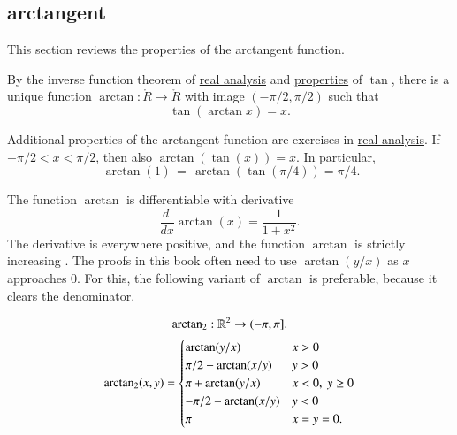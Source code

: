 \subsection{arctangent}

This section reviews the properties of the arctangent function.  

\begin{definition}[arctangent]\label{def:arctan}
  By the inverse function theorem of \hyperref[back:analysis]{real
    analysis} and \hyperref[lemma:tan-monotone]{properties} of $\tan$,
  there is a unique function $\arctan:\ring{R}\to\ring{R}$ with image
  $(-\pi/2,\pi/2)$ such that
\begin{equation}\label{eqn:tanarctan}\tan(\arctan x) =x.\end{equation}
%
\end{definition}

Additional properties of the arctangent function are exercises in
\hyperref[back:analysis]{real analysis}.  If $-\pi/2 < x < \pi/2$,
then also $\arctan(\tan(x)) = x$. In particular,%
\begin{equation}\label{eqn:arctan-1}\
\arctan(1) \hyperref[lemma:tan-pi4]{\,=\,} \arctan(\tan(\pi/4)) = \pi/4.
\end{equation}


The function $\arctan$ is differentiable with derivative%
\begin{equation}\label{eqn:deriv-tan}\frac{d\phantom{~}} {dx} \arctan(x) = \frac{1}{1 +
    x^2}.\end{equation}
The derivative is everywhere positive, and the function $\arctan$ is
strictly increasing \mar{\guid{LQCXGZX} increasing}.
%
The proofs in this book often need to use $\arctan(y/x)$ as  $x$ approaches $0$.
For this, the following variant of $\arctan$ is preferable, because it clears the denominator.


\begin{definition}[$\atn$]\label{def:atn}
\begin{displaymath}
{\operatorname{arctan\ensuremath{_2}}}: \mathbb{R}^2 \to (-\pi,\pi].
\end{displaymath}
\begin{displaymath}
{\operatorname{arctan\ensuremath{_2}}}(x,y) = \begin{cases}
\arctan(y/x) & x > 0\\
\pi/2- \arctan(x/y) & y > 0 \\
\pi + \arctan(y/x) & x< 0,\  y\ge 0\\
-\pi/2- \arctan(x/y) & y< 0 \\
\pi & x= y=0.\\
\end{cases}
\end{displaymath}
\end{definition}
%
%


